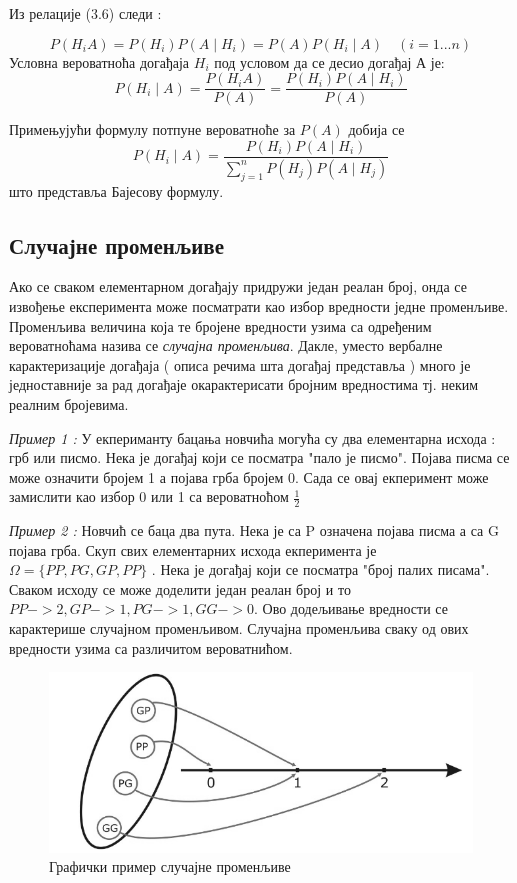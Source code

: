 \begin{dok}
Из релације (3.6) следи :

\begin{equation}
P(H_iA) = P(H_i)P(A \mid H_i) = P(A)P(H_i \mid A) \quad  (i=1...n)
\end{equation}
Условна вероватноћа догађаја $H_i$ под условом да се десио догађај А је:
$$ P(H_i \mid A) = \frac{P(H_iA)}{P(A)} = \frac{P(H_i)P(A \mid H_i) }{P(A)} $$

Примењујући формулу потпуне вероватноће за $P(A)$  добија се 
$$
 P(H_i \mid A ) = \frac{P(H_i)P(A \mid H_i)}{ \sum_{j=1}^n P(H_j)P(A \mid H_j)}
$$
што представља Бајесову формулу.

\end{dok}

\subsection{Случајне променљиве}

Ако се сваком елементарном догађају придружи један реалан број, онда се извођење експеримента може посматрати као избор вредности једне променљиве. Променљива величина која 
 те бројене вредности узима са одређеним вероватноћама назива се \textit{случајна променљива}. Дакле, уместо вербалне карактеризације догађаја ( описа речима шта догађај представља ) много је једноставније за рад догађаје окарактерисати бројним вредностима тј. неким реалним бројевима.

\textit{Пример 1 :} У екпериманту бацања новчића могућа су два елементарна исхода : грб или писмо. Нека је догађај који се посматра "пало је писмо". Појава писма се може означити бројем 1 а појава грба бројем 0. Сада се овај екперимент може замислити као избор 0 или 1 са вероватноћом $\frac{1}{2}$

\textit{Пример 2 :} Новчић се баца два пута. Нека је са P означена појава писма а са G појава грба. Скуп свих елементарних исхода екперимента је $ \Omega = \lbrace PP,PG,GP,PP \rbrace$ . Нека је догађај који се посматра "број палих писама". Сваком исходу се може доделити један реалан број и то $ PP -> 2, GP -> 1,PG -> 1, GG ->0$. Ово додељивање вредности се карактерише случајном променљивом.  Случајна променљива сваку од ових вредности узима са различитом вероватнићом.  

\begin{figure}[H]
    \centering
   \includegraphics[scale=0.5]{./Slike/slika12.png} 
	\caption{Графички пример случајне променљиве}
	\label{fig:slika12}
\end{figure}

